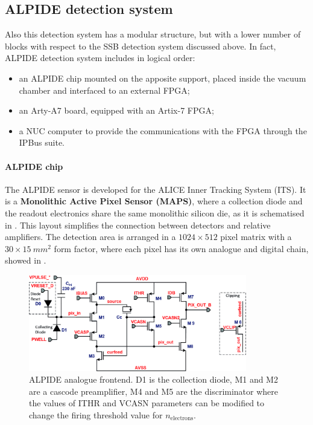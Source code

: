 \documentclass[../../main/main.tex]{subfiles}
\begin{document}
\subsection{ALPIDE detection system}
Also this detection system has a modular structure, but with a lower number of blocks with respect to the SSB detection system discussed above. In fact, ALPIDE detection system includes in logical order:
\begin{itemize}
    \item an ALPIDE chip mounted on the apposite support, placed inside the vacuum chamber and interfaced to an external FPGA;
    \item an Arty-A7 board, equipped with an Artix-7 FPGA;
    \item a NUC computer to provide the communications with the FPGA through the IPBus suite.
\end{itemize}


\paragraph{ALPIDE chip}
The ALPIDE sensor is developed for the ALICE Inner Tracking System (ITS). It is a \textbf{Monolithic Active Pixel Sensor (MAPS)}, where a collection diode and the readout electronics share the same monolithic silicon die, as it is schematised in .
This layout simplifies the connection between detectors and relative amplifiers. The detection area is arranged in a \( 1024 \times 512 \) pixel matrix with a \( 30 \times 15 \ \si{mm^2} \) form factor, where each pixel has its own analogue and digital chain, showed in .


\begin{figure}[h]
    \centering
    \includegraphics[width=0.85\textwidth]{../sections/02/images/alpide/FRONT-END.jpg}
    \caption{ALPIDE analogue frontend. D1 is the collection diode, M1 and M2 are a cascode preamplifier, M4 and M5 are the discriminator where the values of ITHR and VCASN  parameters can be modified to change the firing threshold value for \( n_{\mathrm{electrons}} \).}
    \label{fig:detection_alpide_frontend}
\end{figure}
\end{document}
